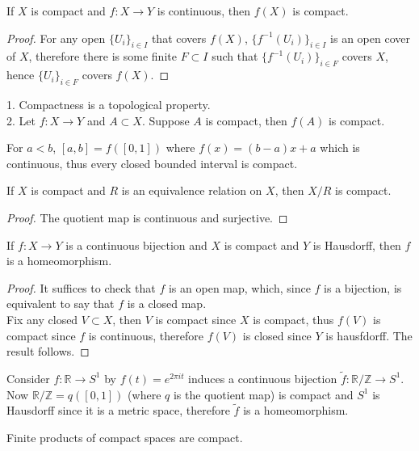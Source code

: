 \begin{proposition}
    If $X$ is compact and $f:X\to Y$ is continuous, then $f(X)$ is compact.
\end{proposition}
\begin{proof}
    For any open $\{U_i\}_{i\in I}$ that covers $f(X)$, $\{f^{-1}(U_i)\}_{i\in I}$ is an open cover of $X$, therefore there is some finite $F\subset I$ such that $\{f^{-1}(U_i)\}_{i\in F}$ covers $X$, hence $\{U_i\}_{i\in F}$ covers $f(X)$.
\end{proof}
\begin{remark}
    1. Compactness is a topological property.\\
    2. Let $f:X\to Y$ and $A\subset X$.
    Suppose $A$ is compact, then $f(A)$ is compact.
\end{remark}
\begin{example}
    For $a<b$, $[a,b]=f([0,1])$ where $f(x)=(b-a)x+a$ which is continuous, thus every closed bounded interval is compact.
\end{example}
\begin{corollary}
    If $X$ is compact and $R$ is an equivalence relation on $X$, then $X/R$ is compact.
\end{corollary}
\begin{proof}
    The quotient map is continuous and surjective.
\end{proof}
\begin{theorem}
    If $f:X\to Y$ is a continuous bijection and $X$ is compact and $Y$ is Hausdorff, then $f$ is a homeomorphism.
\end{theorem}
\begin{proof}
    It suffices to check that $f$ is an open map, which, since $f$ is a bijection, is equivalent to say that $f$ is a closed map.\\
    Fix any closed $V\subset X$, then $V$ is compact since $X$ is compact, thus $f(V)$ is compact since $f$ is continuous, therefore $f(V)$ is closed since $Y$ is hausfdorff.
    The result follows.
\end{proof}
\begin{example}
    Consider $f:\mathbb R\to S^1$ by $f(t)=e^{2\pi it}$ induces a continuous bijection $\tilde{f}:\mathbb R/\mathbb Z\to S^1$.
    Now $\mathbb R/\mathbb Z=q([0,1])$ (where $q$ is the quotient map) is compact and $S^1$ is Hausdorff since it is a metric space, therefore $\tilde{f}$ is a homeomorphism.
\end{example}
\begin{theorem}\label{tycho_finite}
    Finite products of compact spaces are compact.
\end{theorem}
